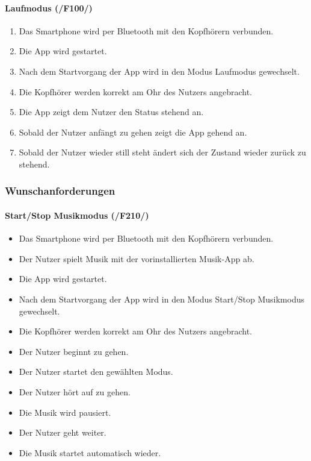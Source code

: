 \documentclass[a4paper,12pt]{article}
\begin{document}
  \paragraph{Laufmodus (/F100/)}
  \begin{enumerate}
    \item Das Smartphone wird per Bluetooth mit den Kopfhörern verbunden.
    \item Die App wird gestartet.
    \item Nach dem Startvorgang der App wird in den Modus \glqq Laufmodus\grqq{} gewechselt. %
    \item Die Kopfhörer werden korrekt am Ohr des Nutzers angebracht. %
    \item Die App zeigt dem Nutzer den Status \glqq stehend\grqq{} an.
    \item Sobald der Nutzer anfängt zu gehen zeigt die App \glqq gehend\grqq{} an.
    \item Sobald der Nutzer wieder still steht ändert sich der Zustand wieder zurück zu \glqq stehend\grqq. 
  \end{enumerate}

  \subsubsection{Wunschanforderungen}
  \paragraph{Start/Stop Musikmodus (/F210/)}
  \begin{itemize}
    \item[] Das Smartphone wird per Bluetooth mit den Kopfhörern verbunden.
    \item[] Der Nutzer spielt Musik mit der vorinstallierten Musik-App ab.
    \item[] Die App wird gestartet.
    \item[] Nach dem Startvorgang der App wird in den Modus \glqq Start/Stop Musikmodus\grqq{} gewechselt.
    \item[] Die Kopfhörer werden korrekt am Ohr des Nutzers angebracht.
    \item[] Der Nutzer beginnt zu gehen.
    \item[] Der Nutzer startet den gewählten Modus.
    \item[] Der Nutzer hört auf zu gehen.
    \item[] Die Musik wird pausiert.
    \item[] Der Nutzer geht weiter.
    \item[] Die Musik startet automatisch wieder.
  \end{itemize}
  
\end{document}
